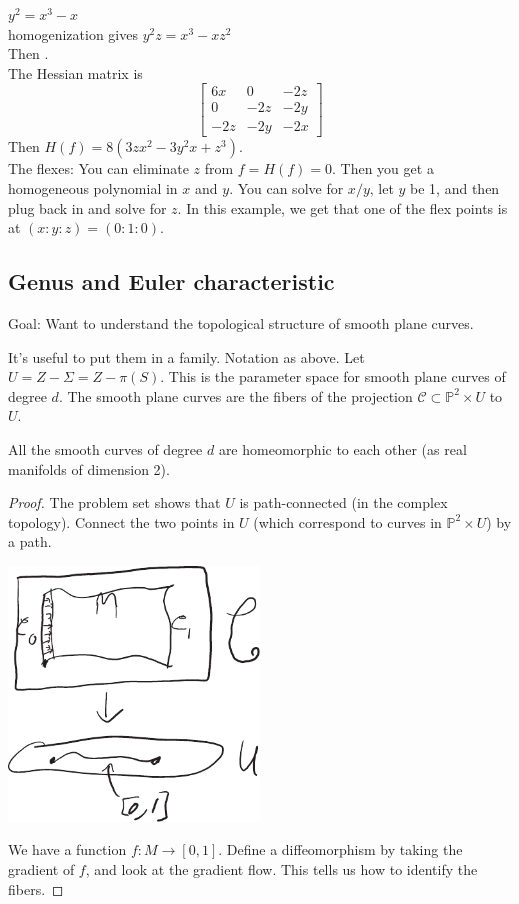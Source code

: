 \documentclass [letterpaper,11pt,twoside]{article}
\begin{document}
  \begin{eg*}
    $y^2 = x^3 - x$ \\
    homogenization gives $y^2z = x^3 - xz^2$ \\
    Then . \\
    The Hessian matrix is $$\begin{bmatrix} 6x & 0 & -2z \\ 0 & -2z & -2y \\ -2z & -2y & -2x \end{bmatrix}$$
    Then $H(f) = 8(3zx^2 - 3y^2x + z^3)$.  \\
    The flexes: You can eliminate $z$ from $f = H(f) = 0$.  Then you get a homogeneous polynomial in $x$ and $y$.  You can solve for $x / y$, let $y$ be 1, and then plug back in and solve for $z$.  In this example, we get that one of the flex points is at $(x:y:z) = (0:1:0)$.
  \end{eg*}

  \subsection*{Genus and Euler characteristic}
    Goal: Want to understand the topological structure of smooth plane curves.

    It's useful to put them in a family.  Notation as above.  Let $U = Z  - \Sigma = Z - \pi(S)$.  This is the parameter space for smooth plane curves of degree $d$.  The smooth plane curves are the fibers of the projection $\mathcal C\subset \mathbb P^2 \times U$ to $U$.

    \begin{prop*}
      All the smooth curves of degree $d$ are homeomorphic to each other (as real manifolds of dimension 2).
    \end{prop*}
    \begin{proof}
      The problem set shows that $U$ is path-connected (in the complex topology).  Connect the two points in $U$ (which correspond to curves in $\mathbb P^2 \times U$) by a path.

      \begin{center}\includegraphics[width=0.5\textwidth]{2011-02-11_Diagram_001}\end{center}

      We have a function $f: M \to [0, 1]$.  Define a diffeomorphism by taking the gradient of $f$, and look at the gradient flow.  This tells us how to identify the fibers.
    \end{proof}
\end{document}
